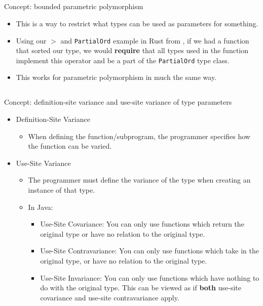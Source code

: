 \subsection{}
Concept: bounded parametric polymorphism

\begin{itemize}[noitemsep]
\item This is a way to restrict what types can be used as parameters for something.
\item Using our $>$ and \texttt{PartialOrd} example in Rust from , if we had a function that sorted our type, we would \textbf{require} that all types used in the function implement this operator and be a part of the \texttt{PartialOrd} type class.
\item This works for parametric polymorphism in much the same way.
\end{itemize}

\subsection{}
Concept: definition-site variance and use-site variance of type parameters

\begin{itemize}
\item Definition-Site Variance
  \begin{itemize}[noitemsep]
  \item When defining the function/subprogram, the programmer specifies how the function can be varied.
  \end{itemize}

\item Use-Site Variance
  \begin{itemize}[noitemsep]
  \item The programmer must define the variance of the type when creating an instance of that type.
  \item In Java:
    \begin{itemize}[noitemsep]
    \item Use-Site Covariance: You can only use functions which return the original type or have no relation to the original type.
    \item Use-Site Contravariance: You can only use functions which take in the original type, or have no relation to the original type.
    \item Use-Site Invariance: You can only use functions which have nothing to do with the original type. This can be viewed as if \textbf{both} use-site covariance and use-site contravariance apply.
    \end{itemize}
  \end{itemize}
\end{itemize}

